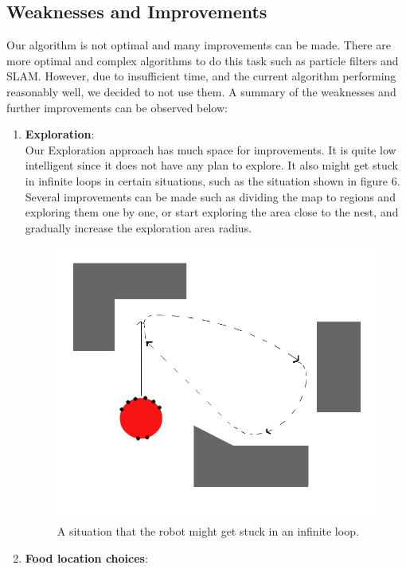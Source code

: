 \documentclass[]{article}
\begin{document}
\subsection{Weaknesses and Improvements}
Our algorithm is not optimal and many improvements can be made. There are more optimal and complex algorithms to do this task such as particle filters and SLAM. However, due to insufficient time, and the current algorithm performing reasonably well, we decided to not use them. A summary of the weaknesses and further improvements can be observed below:
\begin{enumerate}
 \item \textbf{Exploration}:\\
 Our Exploration approach has much space for improvements. It is quite low intelligent since it does not have any plan to explore. It also might get stuck in infinite loops in certain situations, such as the situation shown in figure 6. Several improvements can be made such as dividing the map to regions and exploring them one by one, or start exploring the area close to the nest, and gradually increase the exploration area radius.
 \begin{figure}[h]
 \includegraphics[scale=0.35]{InfiniteLoop}
 \centering
 \caption{A situation that the robot might get stuck in an infinite loop.}
 \end{figure}
 \item \textbf{Food location choices}:\\

\end{enumerate}
\end{document}
